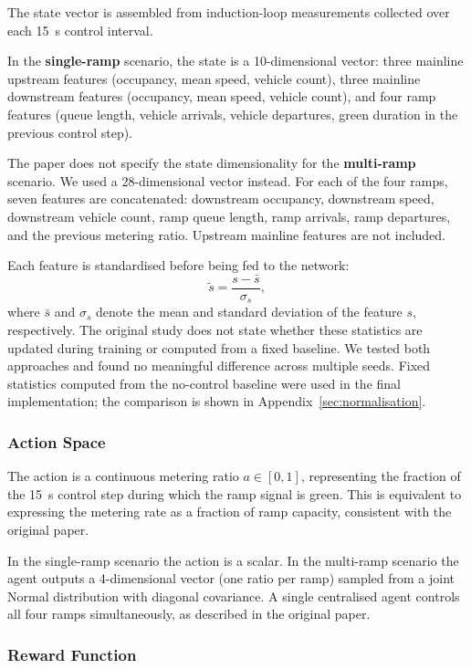     The state vector is assembled from induction-loop measurements collected over each 15~s control interval.

    In the \textbf{single-ramp} scenario, the state is a 10-dimensional vector: three mainline upstream features (occupancy, mean speed, vehicle count), three mainline downstream features (occupancy, mean speed, vehicle count), and four ramp features (queue length, vehicle arrivals, vehicle departures, green duration in the previous control step).

    The paper does not specify the state dimensionality for the \textbf{multi-ramp} scenario. We used a 28-dimensional vector instead. For each of the four ramps, seven features are concatenated: downstream occupancy, downstream speed, downstream vehicle count, ramp queue length, ramp arrivals, ramp departures, and the previous metering ratio. Upstream mainline features are not included.

    Each feature is standardised before being fed to the network:
    \[
    \tilde{s} = \frac{s - \bar{s}}{\sigma_s},
    \]
    where $\bar s$ and $\sigma_s$ denote the mean and standard deviation of the feature $s$, respectively. The original study does not state whether these statistics are updated during training or computed from a fixed baseline. We tested both approaches and found no meaningful difference across multiple seeds. Fixed statistics computed from the no-control baseline were used in the final implementation; the comparison is shown in Appendix~\ref{sec:normalisation}.

\subsubsection{Action Space}

    The action is a continuous metering ratio $a \in [0,1]$, representing the fraction of the 15~s control step during which the ramp signal is green. This is equivalent to expressing the metering rate as a fraction of ramp capacity, consistent with the original paper.

    In the single-ramp scenario the action is a scalar. In the multi-ramp scenario the agent outputs a 4-dimensional vector (one ratio per ramp) sampled from a joint Normal distribution with diagonal covariance. A single centralised agent controls all four ramps simultaneously, as described in the original paper.

\subsubsection{Reward Function}
    \label{sec:reward}

